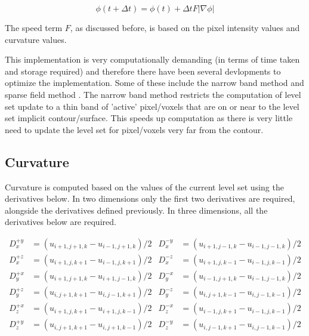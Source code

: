 \begin{equation}
\phi(t+\Delta t) =\phi(t) + \Delta t F|\nabla\phi|
\label{eq:phi}
\end{equation}


The speed term $F$, as discussed before, is based on the pixel intensity values and curvature values. 

This implementation is very computationally demanding (in terms of time taken and storage required) and therefore there have been several devlopments to optimize the implementation. Some of these include the narrow band method \cite{narrowband} and sparse field method \cite{sparsefield}. The narrow band method restricts the computation of level set update to a thin band of 'active' pixel/voxels that are on or near to the level set implicit contour/surface. This speeds up computation as there is very little need to update the level set for pixel/voxels very far from the contour.



\subsection{Curvature}
Curvature is computed based on the values of the current level set using the derivatives below. In two dimensions only the first two derivatives are required, alongside the derivatives defined previously. In three dimensions, all the derivatives below are required.

\begin{spacing}{1.1}
\begin{align}
	D_x^{+y} &= (u_{i+1,j+1,k}-u_{i-1,j+1,k})/2 & 	D_x^{-y} &= (u_{i+1,j-1,k}-u_{i-1,j-1,k})/2 \nonumber\\
	D_x^{+z} &= (u_{i+1,j,k+1}-u_{i-1,j,k+1})/2 &   D_x^{-z} &= (u_{i+1,j,k-1}-u_{i-1,j,k-1})/2 \nonumber\\
	D_y^{+x} &= (u_{i+1,j+1,k}-u_{i+1,j-1,k})/2 & 	D_y^{-x} &= (u_{i-1,j+1,k}-u_{i-1,j-1,k})/2 \nonumber\\
	D_y^{+z} &= (u_{i,j+1,k+1}-u_{i,j-1,k+1})/2 &	  D_y^{-z} &= (u_{i,j+1,k-1}-u_{i,j-1,k-1})/2 \nonumber\\
	D_z^{+x} &= (u_{i+1,j,k+1}-u_{i+1,j,k-1})/2 & 	D_z^{-x} &= (u_{i-1,j,k+1}-u_{i-1,j,k-1})/2 \nonumber\\
	D_z^{+y} &= (u_{i,j+1,k+1}-u_{i,j+1,k-1})/2 &	  D_z^{-y} &= (u_{i,j-1,k+1}-u_{i,j-1,k-1})/2 \nonumber\\
\end{align}
\end{spacing}

